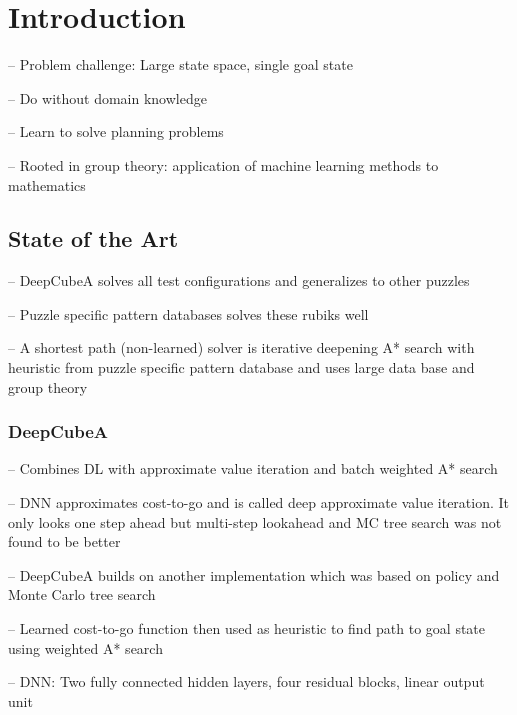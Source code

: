 \documentclass[../main.tex]{subfiles}
\begin{document}
\chapter{Introduction}
\cite{SolvingNature}
-- Problem challenge: Large state space, single goal state 

-- Do without domain knowledge

-- Learn to solve planning problems

-- Rooted in group theory: application of machine learning methods to mathematics


\section{State of the Art}
\cite{SolvingNature}
-- DeepCubeA solves all test configurations and generalizes to other puzzles

-- Puzzle specific pattern databases solves these rubiks well

-- A shortest path (non-learned) solver is iterative deepening A* search with heuristic from puzzle specific pattern database and uses large data base and group theory 

\subsection{DeepCubeA}
\cite{SolvingNature}
-- Combines DL with approximate value iteration and batch weighted A* search

-- DNN approximates cost-to-go and is called deep approximate value iteration. It only looks one step ahead but multi-step lookahead  and MC tree search was not found to be better

-- DeepCubeA builds on another implementation which was based on policy and Monte Carlo tree search 

-- Learned cost-to-go function then used as heuristic to find path to goal state using weighted A* search

-- DNN: Two fully connected hidden layers, four residual blocks, linear output unit
\end{document}
